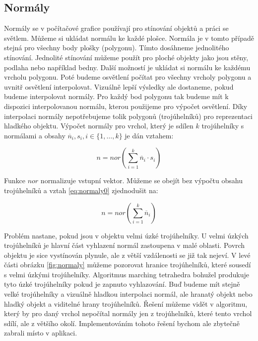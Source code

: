 \subsection{Normály}
\label{subsec:normal}
Normály se v počítačové grafice používají pro stínování objektů a práci se světlem.
Můžeme si ukládat normálu ke každé plošce.
Normála je v tomto případě stejná pro všechny body plošky (polygonu).
Tímto dosáhneme jednolitého stínování.
Jednolité stínování můžeme použít pro ploché objekty jako jsou stěny, podlaha nebo například bedny.
Další možností je ukládat si normálu ke každému vrcholu polygonu.
Poté budeme osvětlení počítat pro všechny vrcholy polygonu a uvnitř osvětlení interpolovat.
Vizuálně lepší výsledky ale do\-sta\-ne\-me, pokud budeme interpolovat normály.
Pro každý bod polygonu tak budeme mít k dispozici interpolovanou normálu, kterou použijeme pro výpočet osvětlení.
Díky interpolaci normály nepotřebujeme tolik polygonů (trojúhelníků) pro reprezentaci hladkého objektu.
Výpočet normály pro vrchol, který je sdílen $k$ trojúhelníky s normálami a obsahy $\overline{n}_i,s_i, i \in \{1,\dotsc,k \}$ je dán vztahem:

\begin{equation}
\label{eq:normaly0}
n=nor \left(\sum_{i=1}^k \overline{n}_i \cdot s_i \right)
\end{equation}

Funkce $nor$ normalizuje vstupní vektor. Můžeme se obejít bez výpočtu obsahu troj\-ú\-hel\-ní\-ků a vztah \ref{eq:normaly0} zjednodušit na:

\begin{equation}
\label{eq:normaly1}
n=nor \left(\sum_{i=1}^k \overline{n}_i \right)
\end{equation}

Problém nastane, pokud jsou v objektu velmi úzké trojúhelníky.
U velmi úzkých troj\-ú\-hel\-ní\-ků je hlavní část vyhlazení normál zastoupena v malé oblasti.
Povrch objektu je sice vystínován plynule, ale z větší vzdálenosti se již tak nejeví.
V levé části obrázku \ref{fig:normaly} můžeme pozorovat hranice trojúhelníků, které sousedí s velmi úzkými trojúhelníky.
Algoritmus marching tetrahedra bohužel produkuje tyto úzké trojúhelníky pokud je zapnuto vyhlazování.
Buď budeme mít stejně velké trojúhelníky a vizuálně hladkou interpolaci normál, ale hranatý objekt nebo hladký objekt a viditelné hrany trojúhelníků.
Řešení můžeme vidět v algoritmu, který by pro daný vrchol nepočítal normály jen z trojúhelníků, které tento vrchol sdílí, ale z většího okolí.
Implementováním tohoto řešení bychom ale zbytečně zabrali místo v aplikaci.

